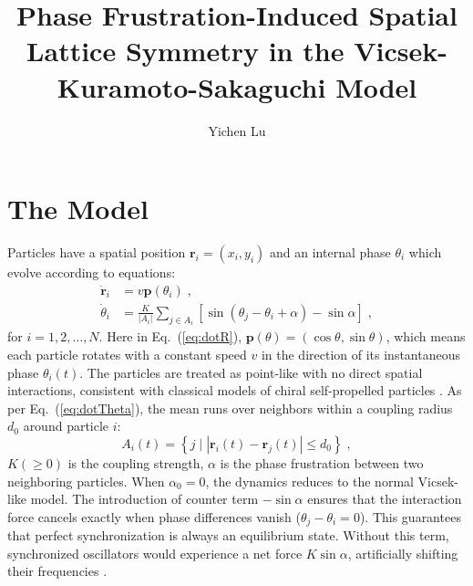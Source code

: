 \documentclass{article}
\title{\textbf{Phase Frustration-Induced Spatial Lattice Symmetry in the Vicsek-Kuramoto-Sakaguchi Model}}
\author{Yichen Lu}
\begin{document}
\maketitle

\tableofcontents

\section{The Model}

Particles have a spatial position $\mathbf{r}_i=\left( x_i, y_i \right)$ and an internal phase $\theta_i$ which evolve according to equations:
\begin{subequations} 
    \label{eq:totalDynamicsMeanField}
    \begin{align}
        \dot{\mathbf{r}}_i&=v\mathbf{p}\left( \theta _i \right)\;\label{eq:dotR},
        \\
        \dot{\theta}_i&=\frac{K}{\left| A_i \right|}\sum_{j\in A_i}{\left[ \sin \left( \theta _j-\theta _i+\alpha \right) -\sin \alpha \right]}\;\label{eq:dotTheta},
    \end{align}
\end{subequations}
for $i=1,2,\ldots,N$. Here in Eq.~(\ref{eq:dotR}), $\mathbf{p}\left( \theta \right) =\left( \cos \theta ,\sin \theta \right)$, which means each particle rotates with a constant speed $v$ in the direction of its instantaneous phase $\theta_i (t)$. 
The particles are treated as point-like with no direct spatial interactions, consistent with classical models of chiral self-propelled particles \cite{PhysRevResearch.1.023026,PhysRevLett.119.058002,Fruchart2021,PhysRevLett.127.238001,PhysRevLett.133.258302}.
As per Eq.~(\ref{eq:dotTheta}), the mean runs over neighbors within a coupling radius $d_0$ around particle $i$:
\begin{equation}
    A_i\left( t \right) =\left\{ j\mid \left| \mathbf{r}_i\left( t \right) -\mathbf{r}_j\left( t \right) \right|\leqslant d_0 \right\} \;,
\end{equation}
$K \left(\geqslant 0\right)$ is the coupling strength, $\alpha$ is the phase frustration between two neighboring particles. When $\alpha_0=0$, the dynamics reduces to the normal Vicsek-like model.
The introduction of counter term $-\sin\alpha$ ensures that the interaction force cancels exactly when phase differences vanish ($\theta_j - \theta_i = 0$). This guarantees that perfect synchronization is always an equilibrium state. Without this term, synchronized oscillators would experience a net force $K\sin\alpha$, artificially shifting their frequencies \cite{10.1143/PTP.79.1069}.
\end{document}
